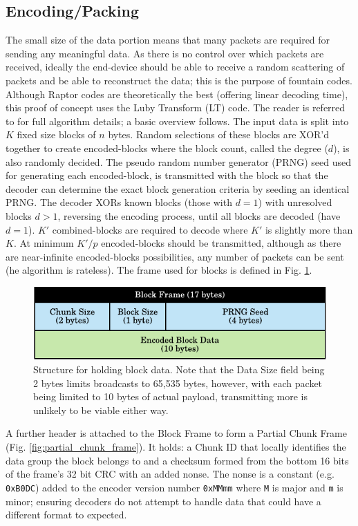 \documentclass[conference]{IEEEtran} %
\begin{document}
\subsection{Encoding/Packing}
The small size of the data portion means that many packets are required for sending any meaningful data. As there is no control over which packets are received, ideally the end-device should be able to receive a random scattering of packets and be able to reconstruct the data; this is the purpose of fountain codes. Although Raptor codes are theoretically the best (offering linear decoding time), this proof of concept uses the Luby Transform (LT) code. The reader is referred to \cite{BT:LUBY_TRANSFORM} for full algorithm details; a basic overview follows. The input data is split into $K$ fixed size blocks of $n$ bytes. Random selections of these blocks are XOR'd together to create encoded-blocks where the block count, called the degree ($d$), is also randomly decided. The pseudo random number generator (PRNG) seed used for generating each encoded-block, is transmitted with the block so that the decoder can determine the exact block generation criteria by seeding an identical PRNG. The decoder XORs known blocks (those with $d=1$) with unresolved blocks $d > 1$, reversing the encoding process, until all blocks are decoded (have $d=1$). $K'$ combined-blocks are required to decode where $K'$ is slightly more than $K$. At minimum $K' / p$ encoded-blocks should be transmitted, although as there are near-infinite encoded-blocks possibilities, any number of packets can be sent (he algorithm is rateless). The frame used for blocks is defined in Fig. \ref{fig:block_frame}. 

\begin{figure}[H]
    \centering
   	\includegraphics[scale=0.75]{Figures/block_frame}
    \caption{
   Structure for holding block data. Note that the Data Size field being 2 bytes limits broadcasts to 65,535 bytes, however, with each packet being limited to 10 bytes of actual payload, transmitting more is unlikely to be viable either way.
    }
    \label{fig:block_frame}
\end{figure}

A further header is attached to the Block Frame to form a Partial Chunk Frame (Fig. \ref{fig:partial_chunk_frame}). It holds: a Chunk ID that locally identifies the data group the block belongs to and a checksum formed from the bottom 16 bits of the frame's 32 bit CRC with an added nonse. The nonse is a constant (e.g. \texttt{0xB0DC}) added to the encoder version number \texttt{0xMMmm} where \texttt{M} is major and \texttt{m} is minor; ensuring decoders do not attempt to handle data that could have a different format to expected. 
\end{document}
